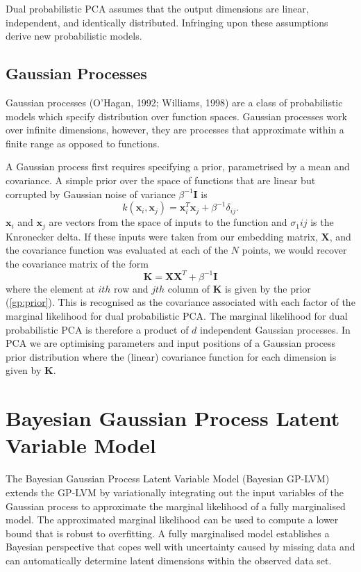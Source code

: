 \documentclass[ %
                    author={Dillon Keith Diep},
                supervisor={Dr. Carl Henrik Ek},
                    degree={MEng},
                     title={Assisted Content Generation for 3D Hair Geometry},
                  subtitle={[INCOMPLETE DRAFT, NOT FOR SUBMISSION]},
                      type={Research},
                      year={2014} ]{dissertation}
\begin{document}
Dual probabilistic PCA assumes that the output dimensions are linear, independent, and identically distributed. Infringing upon these assumptions derive new probabilistic models.

\subsection{Gaussian Processes}
Gaussian processes (O'Hagan, 1992; Williams, 1998) are a class of probabilistic models which specify distribution over function spaces.
Gaussian processes work over infinite dimensions, however, they are processes that approximate within a finite range as opposed to functions.

A Gaussian process first requires specifying a prior, parametrised by a mean and covariance.
A simple prior over the space of functions that are linear but corrupted by Gaussian noise of variance $\beta^{-1}\mathbf{I}$ is
\begin{equation} \label{gp:prior}
	k(\mathbf{x}_i,\mathbf{x}_j)=\mathbf{x}^T_i\mathbf{x}_j+\beta^{-1}\delta_{ij}.
\end{equation}
$\mathbf{x}_i$ and $\mathbf{x}_j$ are vectors from the space of inputs to the function and $\sigma_1{ij}$ is the Knronecker delta. If these inputs were taken from our embedding matrix, $\mathbf{X}$, and the covariance function was evaluated at each of the $N$ points, we would recover the covariance matrix of the form
$$\mathbf{K=XX}^T+\beta^{-1}\mathbf{I}$$
where the element at $ith$ row and $jth$ column of $\mathbf{K}$ is given by the prior (\ref{gp:prior}). This is recognised as the covariance associated with each factor of the marginal likelihood for dual probabilistic PCA. The marginal likelihood for dual probabilistic PCA is therefore a product of $d$ independent Gaussian processes. In PCA we are optimising parameters and input positions of a Gaussian process prior distribution where the (linear) covariance function for each dimension is given by $\mathbf{K}$.

\section{Bayesian Gaussian Process Latent Variable Model}
The Bayesian Gaussian Process Latent Variable Model (Bayesian GP-LVM) \cite{bgplvm} extends the GP-LVM by variationally integrating out the input variables of the Gaussian process to approximate the marginal likelihood of a fully marginalised model. The approximated marginal likelihood can be used to compute a lower bound that is robust to overfitting. A fully marginalised model establishes a Bayesian perspective that copes well with uncertainty caused by missing data and can automatically determine latent dimensions within the observed data set.
\end{document}
